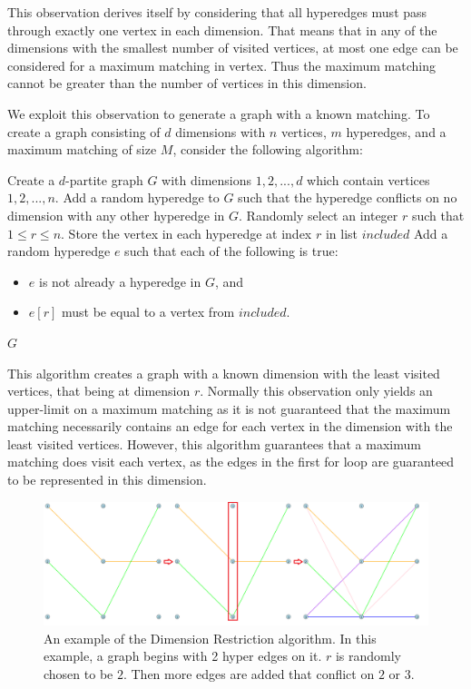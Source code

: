 This observation derives itself by considering that all hyperedges must pass
through exactly one vertex in each dimension. That means that in any of the dimensions
with the smallest number of visited vertices, at most one edge can be considered for a
maximum matching in vertex. Thus the maximum matching cannot be greater than the
number of vertices in this dimension. 

We exploit this observation to generate a graph with a known matching. To create a 
graph consisting of $d$ dimensions with $n$ vertices, $m$ hyperedges, and a maximum
matching of size $M$, consider the following algorithm:

\begin{algorithmic}
\STATE Create a $d$-partite graph $G$ with dimensions $1, 2, ..., d$ which contain vertices $1, 2, ..., n$.
    \STATE Add a random hyperedge to $G$ such that the hyperedge conflicts on no dimension with any other hyperedge in $G$.
\ENDFOR
\STATE Randomly select an integer $r$ such that $1 \leq r \leq n$. 
\STATE Store the vertex in each hyperedge at index $r$ in list $included$
    \STATE Add a random hyperedge $e$ such that each of the following is true:
    \begin{itemize}
        \item $e$ is not already a hyperedge in $G$, and
        \item $e[r]$ must be equal to a vertex from $included$.
    \end{itemize}
\ENDFOR
\RETURN $G$
\end{algorithmic}

This algorithm creates a graph with a known dimension with the least visited 
vertices, that being at dimension $r$. Normally this observation only yields an upper-limit 
on a maximum matching as it is not guaranteed that the maximum matching 
necessarily contains an edge for each vertex in the dimension with the least visited 
vertices. However, this algorithm guarantees that a maximum matching does visit 
each vertex, as the edges in the first for loop are guaranteed to be represented in this 
dimension. 

\begin{figure}[t!]
    \centering
    \begin{minipage}{0.95\textwidth}
        \centering
        \includegraphics[width=\textwidth]{images/exclude.png}
        \caption{An example of the Dimension Restriction algorithm. In this example, a graph begins with 2 hyper edges on it. $r$ is randomly chosen to be $2$. Then more edges are added that conflict on $2$ or $3$.}
        \label{fig:image1}
    \end{minipage}
    \hfill
\end{figure}

